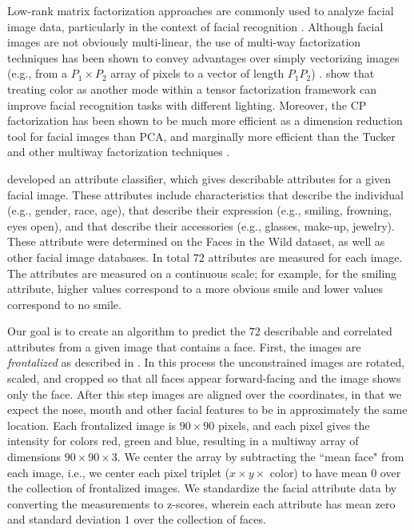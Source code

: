 \documentclass[12pt]{article}
\begin{document}
 Low-rank matrix factorization approaches are commonly used to analyze facial image data, particularly in the context of facial recognition \citep{sirovich1987low,turk1991eigenfaces,vasilescu2002multilinear,kim2007color}.   Although facial images are not obviously multi-linear, the use of multi-way factorization techniques has been shown to convey advantages over simply vectorizing images (e.g., from a $P_1 \times P_2$ array of pixels to a vector of length $P_1P_2$) \citep{vasilescu2002multilinear}.  \citet{kim2007color} show that treating color as another mode within a tensor factorization framework can improve facial recognition tasks with different lighting.   Moreover, the CP factorization has been shown to be much more efficient as a dimension reduction tool for facial images than PCA, and marginally more efficient than the Tucker and other multiway factorization techniques \citep{lockComment}.

\cite{kumar2009attribute} developed an attribute classifier, which gives describable attributes for a given facial image.  These attributes include characteristics that describe the individual (e.g., gender, race, age), that describe their expression (e.g., smiling, frowning, eyes open), and that describe their accessories (e.g., glasses, make-up, jewelry).  These attribute were determined on the Faces in the Wild dataset, as well as other facial image databases.  In total $72$ attributes are measured for each image.  The attributes are measured on a continuous scale;  for example, for the smiling attribute, higher values correspond to a more obvious smile and lower values correspond to no smile. 

Our goal is to create an algorithm to predict the $72$ describable and correlated attributes from a given image that contains a face.  First, the images are \emph{frontalized} as described in \cite{hassner2015effective}.  In this process the unconstrained images are rotated, scaled, and cropped so that all faces appear forward-facing and the image shows only the face.  After this step images are aligned over the coordinates, in that we expect the nose, mouth and other facial features to be in approximately the same location.  Each frontalized image is $90 \times 90$ pixels, and each pixel gives the intensity for colors red, green and blue,  resulting in a multiway array of dimensions $90 \times 90 \times 3$.  We center the array by subtracting the ``mean face" from each image, i.e., we center each pixel triplet ($x \times y \times$ color) to have mean $0$ over the collection of frontalized images.     We standardize the facial attribute data by converting the measurements to z-scores, wherein each attribute has mean zero and standard deviation $1$ over the collection of faces.
 
\end{document}
